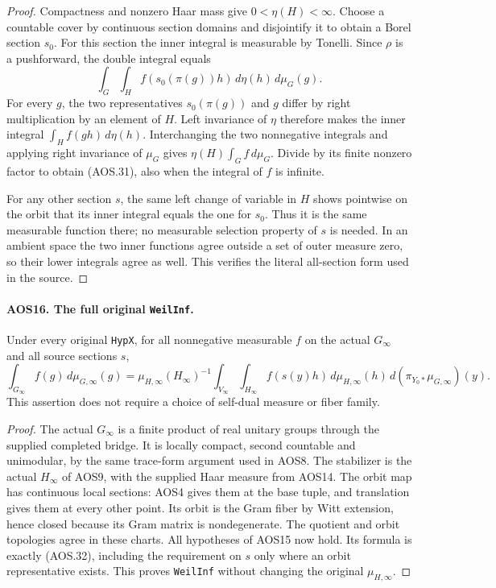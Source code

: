 \begin{proof}
Compactness and nonzero Haar mass give $0<\eta(H)<\infty$.
Choose a countable cover by continuous section domains and
disjointify it to obtain a Borel section $s_0$.
For this section the inner integral is measurable by Tonelli.
Since $\rho$ is a pushforward, the double integral equals
\[
      \int_G\int_H f(s_0(\pi(g))h)\,d\eta(h)\,d\mu_G(g).
\]
For every $g$, the two representatives $s_0(\pi(g))$ and $g$
differ by right multiplication by an element of $H$.
Left invariance of $\eta$ therefore makes the inner integral
$\int_H f(gh)\,d\eta(h)$.  Interchanging the two nonnegative
integrals and applying right invariance of $\mu_G$ gives
$\eta(H)\int_G f\,d\mu_G$.  Divide by its finite nonzero
factor to obtain (AOS.31), also when the integral of $f$ is infinite.

For any other section $s$, the same left change of variable in $H$
shows pointwise on the orbit that its inner integral equals the
one for $s_0$.  Thus it is the same measurable function there;
no measurable selection property of $s$ is needed.  In an ambient
space the two inner functions agree outside a set of outer measure
zero, so their lower integrals agree as well.  This verifies the
literal all-section form used in the source.
\end{proof}

\paragraph{AOS16. The full original \texttt{WeilInf}.}
\label{claim:AOS16}
Under every original \texttt{HypX}, for all nonnegative measurable
$f$ on the actual $G_\infty$ and all source sections $s$,
\[
 \int_{G_\infty}f(g)\,d\mu_{G,\infty}(g)
   =\mu_{H,\infty}(H_\infty)^{-1}
        \int_{V_\infty}\int_{H_\infty}
                 f(s(y)h)\,d\mu_{H,\infty}(h)
                     \,d(\pi_{Y_0*}\mu_{G,\infty})(y).
 \tag{AOS.32}
\]
This assertion does not require a choice of self-dual measure or
fiber family.

\begin{proof}
The actual $G_\infty$ is a finite product of real unitary groups
through the supplied completed bridge.  It is locally compact,
second countable and unimodular, by the same trace-form argument
used in AOS8.  The stabilizer is the actual $H_\infty$ of AOS9,
with the supplied Haar measure from AOS14.  The orbit map has
continuous local sections: AOS4 gives them at the base tuple,
and translation gives them at every other point.  Its orbit is
the Gram fiber by Witt extension, hence closed because its Gram
matrix is nondegenerate.  The quotient and orbit topologies agree
in these charts.  All hypotheses of AOS15 now hold.  Its formula
is exactly (AOS.32), including the requirement on $s$ only where
an orbit representative exists.  This proves \texttt{WeilInf}
without changing the original $\mu_{H,\infty}$.
\end{proof}

